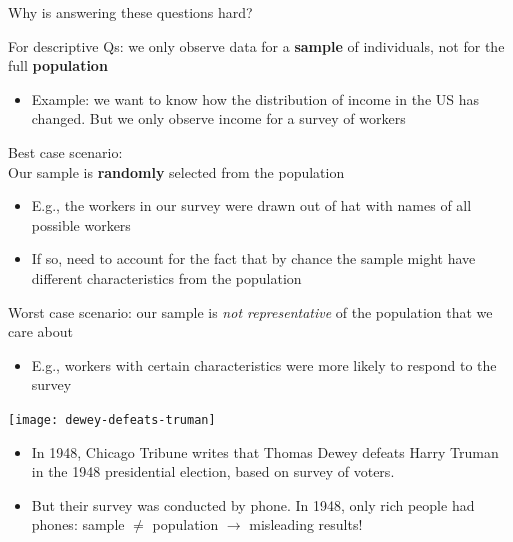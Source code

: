 \documentclass[11pt,english,handout]{beamer}
\newenvironment{wideitemize}{\itemize\addtolength{\itemsep}{10pt}}{\enditemize}
\begin{document}
\begin{frame}{Why is answering these questions hard?}

\begin{wideitemize}
\item
For descriptive Qs: we only observe data for a \textbf{sample} of individuals, not for the full \textbf{population}
	\begin{itemize}
		\item 
		Example: we want to know how the distribution of income in the US has changed. But we only observe income for a survey of workers
	\end{itemize}
\pause

\item Best case scenario: \\Our sample is \textbf{randomly} selected from the population \\
	\begin{itemize}
		\item 
		E.g., the workers in our survey were drawn out of hat with names of all possible workers
		
		\item
		If so, need to account for the fact that by chance the sample might have different characteristics from the population
	\end{itemize}


\pause
\item Worst case scenario: our sample is \textit{not representative} of the population that we care about
	\begin{itemize}
		\item 
		E.g., workers with certain characteristics were more likely to respond to the survey
	\end{itemize}
\end{wideitemize}

\end{frame}


\begin{frame}
\centering
\texttt{[image: dewey-defeats-truman]}
\begin{itemize}
	\item 
	In 1948, Chicago Tribune writes that Thomas Dewey defeats Harry Truman in the 1948 presidential election, based on survey of voters.
	
	\pause
	\item
	But their survey was conducted by phone. In 1948, only rich people had phones: sample $\neq$ population $\rightarrow$ misleading results!
\end{itemize}

\end{frame}
\end{document}
